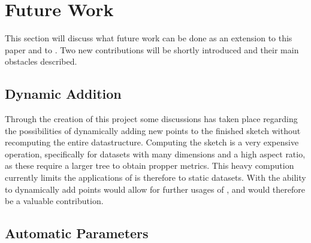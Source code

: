 \section{Future Work}
\label{futurework}
This section will discuss what future work can be done as an extension to this paper and to \cite{wagner17}. Two new contributions will be shortly introduced and their main obstacles described. 

\subsection{Dynamic Addition}
Through the creation of this project some discussions has taken place regarding the possibilities of dynamically adding new points to the finished sketch without recomputing the entire datastructure. Computing the sketch is a very expensive operation, specifically for datasets with many dimensions and a high aspect ratio, as these require a larger tree to obtain propper metrics. This heavy compution currently limits the applications of \qs{} is therefore to static datasets. With the ability to dynamically add points would allow for further usages of \qs{}, and would therefore be a valuable contribution.  

\subsection{Automatic Parameters}
